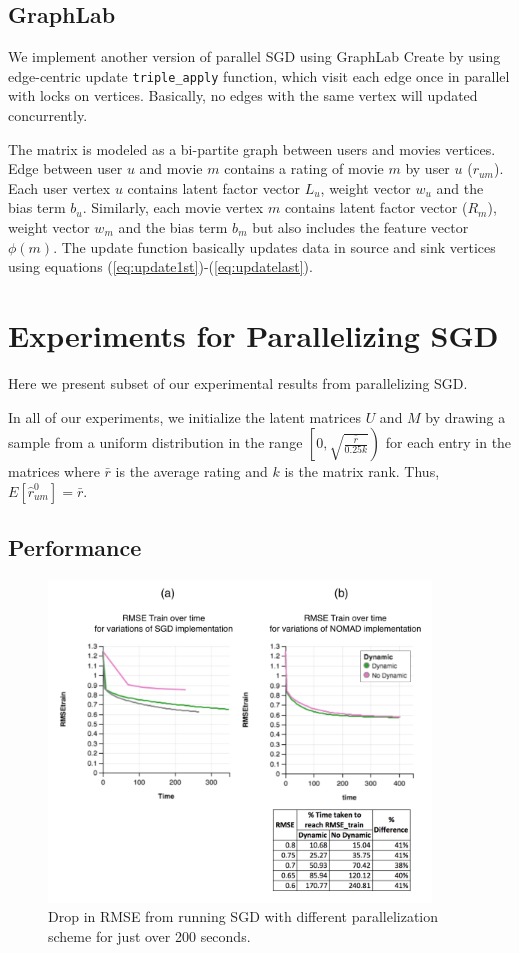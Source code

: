 \documentclass{article} %
\begin{document}
\subsection{GraphLab}

We implement another version of parallel SGD using
GraphLab Create by using edge-centric update \texttt{triple\_apply} function, which visit each edge once in parallel with locks on vertices.
Basically, no edges with the same vertex will updated concurrently.

The matrix is modeled as a bi-partite graph between users and movies vertices.
Edge between user $u$ and movie $m$ contains a rating of movie $m$ by user $u$
($r_{um}$). Each user vertex $u$ contains latent factor vector $L_u$, weight
vector $w_u$ and the bias term $b_u$. Similarly, each movie vertex $m$
contains latent factor vector ($R_m$), weight vector $w_m$ and the bias term
$b_m$ but also includes the feature vector $\phi(m)$.  The update function
 basically updates data in source and sink vertices using equations (\ref{eq:update1st})-(\ref{eq:updatelast}).

\section{Experiments for Parallelizing SGD}

Here we present subset of our experimental results from parallelizing SGD.

In all of our experiments,  we initialize the latent matrices $U$ and $M$ by drawing a sample from a uniform distribution in the range $\left[0,\sqrt{\frac{\bar{r}}{0.25k}}\right)$ for each entry in the matrices where $\bar{r}$ is the average rating and $k$ is the matrix rank. Thus, $E[\hat{r}_{um}^0] = \bar{r}$.

\subsection{Performance}


\begin{figure}[ht]
\centering
\includegraphics[width=4in]{figures/performance}
\caption{\label{fig:performance} Drop in RMSE from running SGD with different parallelization scheme for just over 200 seconds. }
\end{figure}
\end{document}
